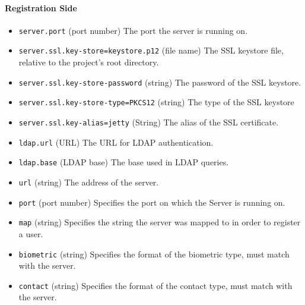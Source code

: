 \paragraph{Registration Side}
\begin{itemize}
\item \verb!server.port! (port number) The port the server is running on.
\item \verb!server.ssl.key-store=keystore.p12! (file name) The SSL keystore file, relative to the project's root directory.
\item \verb!server.ssl.key-store-password! (string) The password of the SSL keystore.
\item \verb!server.ssl.key-store-type=PKCS12! (string) The type of the SSL keystore 
\item \verb!server.ssl.key-alias=jetty! (String) The alias of the SSL certificate.

\item \verb!ldap.url! (URL) The URL for LDAP authentication.
\item \verb!ldap.base! (LDAP base) The base used in LDAP queries.

\item \verb!url! (string) The address of the server.
\item \verb!port! (port number) Specifies the port on which the Server is running on.
\item \verb!map! (string) Specifies the string the server was mapped to in order to register a user.
\item \verb!biometric! (string) Specifies the format of the biometric type, must match with the server.
\item \verb!contact! (string) Specifies the format of the contact type, must match with the server.
\end{itemize}